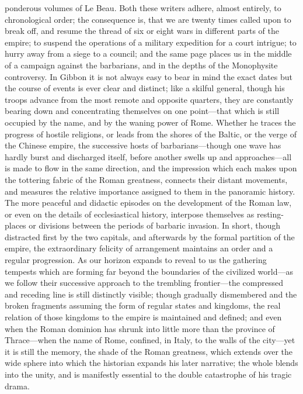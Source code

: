 ponderous volumes of Le Beau. Both these writers adhere, almost entirely,
to chronological order; the consequence is, that we are twenty times
called upon to break off, and resume the thread of six or eight wars in
different parts of the empire; to suspend the operations of a military
expedition for a court intrigue; to hurry away from a siege to a council;
and the same page places us in the middle of a campaign against the barbarians,
and in the depths of the Monophysite controversy. In Gibbon it is not always
easy to bear in mind the exact dates but the course of events is ever clear
and distinct; like a skilful general, though his troops advance from the most
remote and opposite quarters, they are constantly bearing down and
concentrating themselves on one point—that which is still occupied by the name,
and by the waning power of Rome. Whether he traces the progress of hostile
religions, or leads from the shores of the Baltic, or the verge of the
Chinese empire, the successive hosts of barbarians—though one wave has
hardly burst and discharged itself, before another swells up and
approaches—all is made to flow in the same direction, and the impression which
each makes upon the tottering fabric of the Roman greatness, connects their
distant movements, and measures the relative importance assigned to them in
the panoramic history. The more peaceful and didactic episodes on the
development of the Roman law, or even on the details of ecclesiastical history,
interpose themselves as resting-places or divisions between the periods of
barbaric invasion. In short, though distracted first by the two capitals, and
afterwards by the formal partition of the empire, the extraordinary felicity
of arrangement maintains an order and a regular progression. As our horizon
expands to reveal to us the gathering tempests which are forming far beyond
the boundaries of the civilized world—as we follow their successive approach
to the trembling frontier—the compressed and receding line is still distinctly
visible; though gradually dismembered and the broken fragments assuming the
form of regular states and kingdoms, the real relation of those kingdoms to
the empire is maintained and defined; and even when the Roman dominion has
shrunk into little more than the province of Thrace—when the name of Rome,
confined, in Italy, to the walls of the city—yet it is still the memory, the
shade of the Roman greatness, which extends over the wide sphere into which
the historian expands his later narrative; the whole blends into the unity,
and is manifestly essential to the double catastrophe of his tragic drama.

